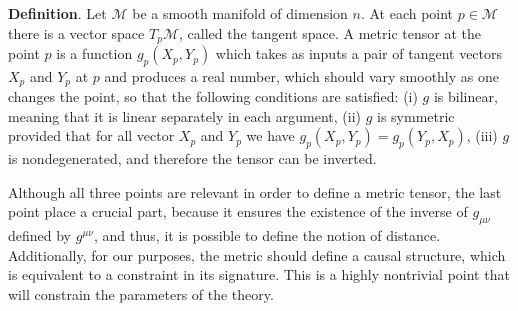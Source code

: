 \documentclass[epj]{svjour}
\begin{document}
\textbf{Definition}. Let $\mathcal{M}$ be a smooth manifold of dimension $n$. At each
point $p \in \mathcal{M}$ there is a vector space $T_p\mathcal{M}$, called the tangent
space. A metric tensor at the point $p$ is a function $g_p (X_p, Y_p)$ which takes as 
inputs a pair of tangent vectors $X_p$ and $Y_p$ at $p$ and produces a real number, which
should vary smoothly as one changes the point, so that the following conditions are 
satisfied: (i) $g$ is bilinear, meaning that it is linear separately in each argument, 
(ii) $g$ is symmetric provided that for all vector $X_p$ and $Y_p$ we have $g_p(X_p, Y_p) = g_p (Y_p, X_p)$, 
(iii) $g$ is nondegenerated, and therefore the tensor can be inverted. 

Although all three points are relevant in order to define a metric tensor, the last point
place a crucial part, because it ensures the existence of the inverse of $g_{\mu\nu}$ defined by $g^{\mu\nu}$, and thus,
it is possible to define the notion of distance. Additionally, for our purposes, the metric should define a causal structure, which is 
equivalent to a constraint in its signature. This is a highly nontrivial point that will 
constrain the parameters of the theory.
\end{document}
